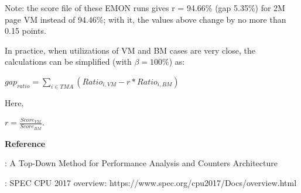 \documentclass[12pt]{article}
\newcommand{\npar}[1]{#1\par}
\newcommand{\dmath}[1]{{\centering $\displaystyle #1$\par}}
\newcommand{\emptypar}{\mbox{}\par}
\begin{document}
\npar{\hspace*{9.75pt}Note: the score file of these EMON runs gives r = 94.66\% (gap 5.35\%) for 2M page VM instead of 94.46\%; with it, the values above change by no more than 0.15 points.}
\emptypar
\npar{\hspace*{9.75pt}In practice, when utilizations of VM and BM cases are very close, the calculations can be simplified (with $\beta =100\%$) as:}
\dmath{\mathit{ga}{\mathit{p}}_{\mathit{ratio}}=\sum\limits_{\mathit{i}\in \mathit{TMA}}{\left( \mathit{Rati}{\mathit{o}}_{\mathit{i},\mathit{VM}}-\mathit{r}*\mathit{Rati}{\mathit{o}}_{\mathit{i},\mathit{BM}} \right)}}
\npar{\hspace*{4\fontdimen2\font}Here,}
\dmath{\mathit{r}=\frac{\mathit{Scor}{\mathit{e}}_{\mathit{VM}}}{\mathit{Scor}{\mathit{e}}_{\mathit{BM}}}.}
\emptypar
\npar{\textbf{Reference}}
\npar{[1]: A Top-Down Method for Performance Analysis and Counters Architecture}
\npar{[2]: SPEC CPU 2017 overview: https://www.spec.org/cpu2017/Docs/overview.html}
\end{document}
